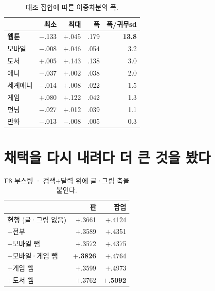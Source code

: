 \documentclass[10pt]{article}
\begin{document}
\begin{table}[t]
\centering\tsize
\caption{대조 집합에 따른 이중차분의 폭.}
\begin{tabular}{lrrrr}
\toprule
& 최소 & 최대 & 폭 & 폭/귀무sd \\
\midrule
\textbf{웹툰} & $-$.133 & $+$.045 & .179 & \textbf{13.8} \\
모바일 & $-$.008 & $+$.046 & .054 & 3.2 \\
도서 & $+$.005 & $+$.143 & .138 & 3.0 \\
애니 & $-$.037 & $+$.002 & .038 & 2.0 \\
세계애니 & $-$.014 & $+$.008 & .022 & 1.5 \\
게임 & $+$.080 & $+$.122 & .042 & 1.3 \\
펀딩 & $-$.027 & $+$.012 & .039 & 1.1 \\
만화 & $-$.013 & $-$.008 & .005 & 0.3 \\
\bottomrule
\end{tabular}
\end{table}


\section{채택을 다시 내려다 더 큰 것을 봤다}

\begin{table}[t]
\centering\tsize
\caption{F8 부스팅 · 검색$+$달력 위에 글·그림 축을 붙인다.}
\begin{tabular}{lrr}
\toprule
& 판 & 팝업 \\
\midrule
현행 (글·그림 없음) & $+$.3661 & $+$.4124 \\
$+$전부 & $+$.3589 & $+$.4351 \\
$+$모바일 뺌 & $+$.3572 & $+$.4375 \\
$+$모바일·게임 뺌 & \textbf{$+$.3826} & $+$.4764 \\
$+$게임 뺌 & $+$.3599 & $+$.4973 \\
$+$도서 뺌 & $+$.3762 & \textbf{$+$.5092} \\
\bottomrule
\end{tabular}
\end{table}
\end{document}
